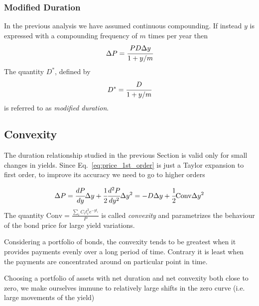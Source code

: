 \subsubsection{Modified Duration}
In the previous analysis we have assumed continuous compounding. If instead $y$ is expressed with a compounding frequency of $m$ times per year then 
\begin{equation}
\Delta P = \cfrac{PD\Delta y}{1+y/m}
\end{equation}
\noindent
The quantity $D^{*}$, defined by
\begin{equation}
D^{*} = \cfrac{D}{1+y/m}
\end{equation}
\noindent
is referred to as \emph{modified duration}. 

\subsection{Convexity}
The duration relationship studied in the previous Section is valid only for small changes in yields. Since Eq.~\ref{eq:price_1st_order} is just a Taylor expansion to first order, to improve its accuracy we need to go to higher orders

\begin{equation}
\Delta P = \cfrac{dP}{dy}\Delta y + \cfrac{1}{2} \cfrac{d^2 P}{dy^2}\Delta y^2 = -D\Delta y + \cfrac{1}{2} \textrm{Conv} \Delta y^2 
\end{equation}
\noindent
The quantity $\textrm{Conv} = \frac{\sum_i C_i t_i^2 e^{-yt_i}}{P}$ is called \emph{convexity} and parametrizes the behaviour of the bond price for large yield variations.

Considering a portfolio of bonds, the convexity tends to be greatest when it provides payments evenly over a long period of time. Contrary it is least when the payments are concentrated around on particular point in time. 

Choosing a portfolio of assets with net duration and net convexity both close to zero, we make ourselves immune to relatively large shifts in the zero curve (i.e. large movements of the yield)

